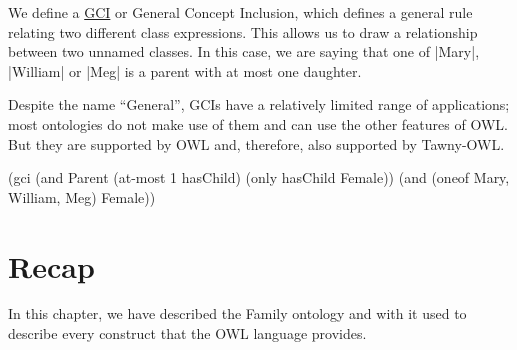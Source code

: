 We define a \href{http://ontogenesis.knowledgeblog.org/1288}{GCI} or
General Concept Inclusion, which defines a general rule relating two
different class expressions. This allows us to draw a relationship
between two unnamed classes. In this case, we are saying that one of
|Mary|, |William| or |Meg| is a parent with at most one daughter.

Despite the name ``General'', GCIs have a relatively limited range of
applications; most ontologies do not make use of them and can use the
other features of OWL. But they are supported by OWL and, therefore,
also supported by Tawny-OWL.

\begin{tawny}
(gci
 (and Parent
      (at-most 1 hasChild)
      (only hasChild Female))
 (and (oneof Mary, William, Meg) Female))
\end{tawny}


\section{Recap}
\label{sec:recap-family}

In this chapter, we have described the Family ontology and with it
used to describe every construct that the OWL language provides.
